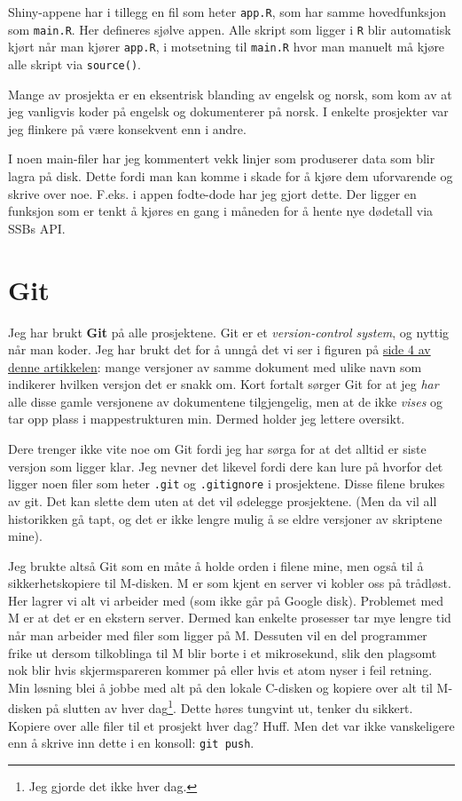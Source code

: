 \documentclass[
  letterpaper,
  DIV=11,
  numbers=noendperiod]{scrreprt}
\begin{document}
Shiny-appene har i tillegg en fil som heter \texttt{app.R}, som har
samme hovedfunksjon som \texttt{main.R}. Her defineres sjølve appen.
Alle skript som ligger i \texttt{R} blir automatisk kjørt når man kjører
\texttt{app.R}, i motsetning til \texttt{main.R} hvor man manuelt må
kjøre alle skript via \texttt{source()}.

Mange av prosjekta er en eksentrisk blanding av engelsk og norsk, som
kom av at jeg vanligvis koder på engelsk og dokumenterer på norsk. I
enkelte prosjekter var jeg flinkere på være konsekvent enn i andre.

I noen main-filer har jeg kommentert vekk linjer som produserer data som
blir lagra på disk. Dette fordi man kan komme i skade for å kjøre dem
uforvarende og skrive over noe. F.eks. i appen fodte-dode har jeg gjort
dette. Der ligger en funksjon som er tenkt å kjøres en gang i måneden
for å hente nye dødetall via SSBs API.

\hypertarget{git}{%
\section{Git}\label{git}}

Jeg har brukt \textbf{Git} på alle prosjektene. Git er et
\emph{version-control system}, og nyttig når man koder. Jeg har brukt
det for å unngå det vi ser i figuren på
\href{https://peerj.com/preprints/3159v2/}{side 4 av denne artikkelen}:
mange versjoner av samme dokument med ulike navn som indikerer hvilken
versjon det er snakk om. Kort fortalt sørger Git for at jeg \emph{har}
alle disse gamle versjonene av dokumentene tilgjengelig, men at de ikke
\emph{vises} og tar opp plass i mappestrukturen min. Dermed holder jeg
lettere oversikt.

Dere trenger ikke vite noe om Git fordi jeg har sørga for at det alltid
er siste versjon som ligger klar. Jeg nevner det likevel fordi dere kan
lure på hvorfor det ligger noen filer som heter \texttt{.git} og
\texttt{.gitignore} i prosjektene. Disse filene brukes av git. Det kan
slette dem uten at det vil ødelegge prosjektene. (Men da vil all
historikken gå tapt, og det er ikke lengre mulig å se eldre versjoner av
skriptene mine).

Jeg brukte altså Git som en måte å holde orden i filene mine, men også
til å sikkerhetskopiere til M-disken. M er som kjent en server vi kobler
oss på trådløst. Her lagrer vi alt vi arbeider med (som ikke går på
Google disk). Problemet med M er at det er en ekstern server. Dermed kan
enkelte prosesser tar mye lengre tid når man arbeider med filer som
ligger på M. Dessuten vil en del programmer frike ut dersom tilkoblinga
til M blir borte i et mikrosekund, slik den plagsomt nok blir hvis
skjermspareren kommer på eller hvis et atom nyser i feil retning. Min
løsning blei å jobbe med alt på den lokale C-disken og kopiere over alt
til M-disken på slutten av hver dag\footnote{Jeg gjorde det ikke hver
  dag.}. Dette høres tungvint ut, tenker du sikkert. Kopiere over alle
filer til et prosjekt hver dag? Huff. Men det var ikke vanskeligere enn
å skrive inn dette i en konsoll: \texttt{git\ push}.
\end{document}
